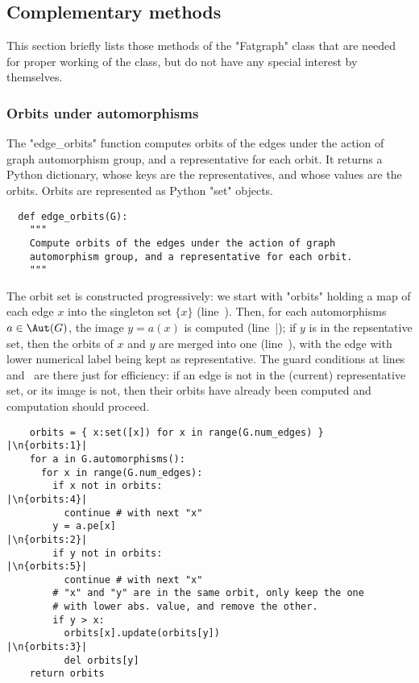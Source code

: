 \subsection{Complementary methods}
\label{sec:complementary}

This section briefly lists those methods of the "Fatgraph" class that
are needed for proper working of the class, but do not have any
special interest by themselves.

\subsubsection{Orbits under automorphisms}
The "edge_orbits" function computes orbits of the edges under the
action of graph automorphism group, and a representative for each
orbit.  It returns a Python dictionary, whose keys are the
representatives, and whose values are the orbits.  Orbits are
represented as Python "set" objects.
\begin{lstlisting}
  def edge_orbits(G):
    """
    Compute orbits of the edges under the action of graph
    automorphism group, and a representative for each orbit.
    """
\end{lstlisting}
The orbit set is constructed progressively: we start with "orbits"
holding a map of each edge $x$ into the singleton set $\{x\}$
(line~). Then, for each automorphisms $a \in \Aut(G)$,
the image $y = a(x)$ is computed (line~|); if $y$ is
in the repsentative set, then the orbits of $x$ and $y$ are merged
into one (line~), with the edge with lower numerical
label being kept as representative.  The guard conditions at
lines~ and~ are there just for efficiency:
if an edge is not in the (current) representative set, or its image is
not, then their orbits have already been computed and computation
should proceed.
\begin{lstlisting}
    orbits = { x:set([x]) for x in range(G.num_edges) }  |\n{orbits:1}|
    for a in G.automorphisms():                          
      for x in range(G.num_edges):
        if x not in orbits:                              |\n{orbits:4}|
          continue # with next "x"
        y = a.pe[x]                                      |\n{orbits:2}|
        if y not in orbits:                              |\n{orbits:5}|
          continue # with next "x"
        # "x" and "y" are in the same orbit, only keep the one
        # with lower abs. value, and remove the other.
        if y > x:
          orbits[x].update(orbits[y])                    |\n{orbits:3}|
          del orbits[y]
    return orbits

\end{lstlisting}

